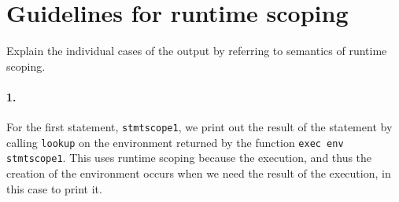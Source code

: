\documentclass{article}
\begin{document}
    \section{Guidelines for runtime scoping}

    \begin{ex}
       Explain the individual cases of the output by referring to semantics of runtime scoping. 

       \paragraph{1.} For the first statement, \texttt{stmtscope1}, we print out the result of the statement by calling \texttt{lookup} on the environment returned by the function \texttt{exec env stmtscope1}. This uses runtime scoping because the execution, and thus the creation of the environment occurs when we need the result of the execution, in this case to print it. 
    \end{ex}
\end{document}
